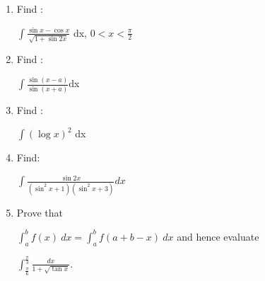 
\begin{enumerate}

\item Find :
    
    \hspace{1cm}$\int \frac{\sin x- \cos x}{\sqrt{1 + \sin 2x}}$ dx, \(0 < x<\frac{\pi}{2}\)

    \item Find :

    \hspace{1cm}$\int \frac{\sin(x-a) }{\sin(x+a)}$dx

    \item Find :
    
    \hspace{1cm}$\int (\log x)^2$ dx
     \item Find:

     \hspace{1cm}$\int\frac{\sin 2x}{(\sin^2 x +1) (\sin^2 x +3)} dx $

     \item Prove that
     
     \hspace{1cm}$\int_{a}^{b} f(x)\   dx =\int_{a}^{b} f(a+b-x)\   dx$ 
    \hspace{8pt}and hence evaluate

     \hspace{1cm}$\int_{\frac{\pi}{6}}^{\frac{\pi}{3}} \frac{dx}{1+\sqrt{\tan x}}$.
    
 \end{enumerate}
 